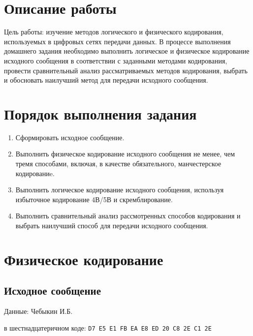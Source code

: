 
\def \labtype {Домашняя}
\def \labnum {1}
\def \labsubj {Сети ЭВМ и телекоммуникации}
\def \labauthor {Чебыкин И. Б.}
\def \labgroup {P3301}
\def \labinsp {Шинкарук Д. Н.}
\isnamefalse

\usepackage{graphicx,tabularx}

\usepackage{caption}

\captionsetup{labelsep=period}
\pagestyle{fancy}



\section{Описание работы}
Цель работы: изучение методов логического и физического кодирования,
используемых в цифровых сетях передачи данных.
В процессе выполнения домашнего задания необходимо выполнить
логическое и физическое кодирование исходного сообщения в соответствии с
заданными методами кодирования, провести сравнительный анализ
рассматриваемых методов кодирования, выбрать и обосновать наилучший метод
для передачи исходного сообщения.
\section{Порядок выполнения задания}
\begin{enumerate}
\item Сформировать исходное сообщение.
\item Выполнить физическое кодирование исходного сообщения не менее, чем
тремя способами, включая, в качестве обязательного, манчестерское кодированиe.
\item Выполнить логическое кодирование исходного сообщения, используя
избыточное кодирование 4В/5В и скремблирование.
\item Выполнить сравнительный анализ рассмотренных способов
кодирования и выбрать наилучший способ для передачи исходного сообщения.
\end{enumerate}
\newpage
\section{Физическое кодирование}
\subsection{Исходное сообщение}
Данные: Чебыкин И.Б.

в шестнадцатеричном коде: \verb|D7 E5 E1 FB EA E8 ED 20 C8 2E C1 2E|

